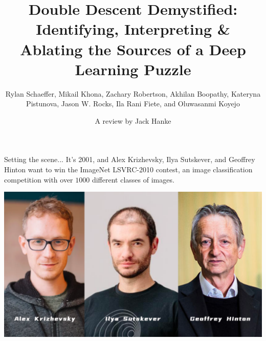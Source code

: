 \documentclass{beamer}
\title[Double Descent Demystified]{Double Descent Demystified: Identifying, Interpreting \& Ablating the Sources of a Deep Learning Puzzle}
\subtitle[Rylan Schaeffer, ]{Rylan Schaeffer, Mikail Khona, Zachary Robertson, Akhilan Boopathy, Kateryna Pistunova, Jason W. Rocks, Ila Rani Fiete, and Oluwasanmi Koyejo}
\author{A review by Jack Hanke}
\begin{document}
\usetikzlibrary{calc}

\usebackgroundtemplate{}


\begin{frame}
    \titlepage
\end{frame}


\begin{frame}{Setting the scene...}
    It's 2001, and Alex Krizhevsky, Ilya Sutskever, and Geoffrey Hinton want to win the ImageNet LSVRC-2010 contest, an image classification competition with over $1000$ different classes of images. 
    
    \begin{center}
        \includegraphics[scale=0.25]{theboys.png}    
    \end{center}

\end{frame}
\end{document}
